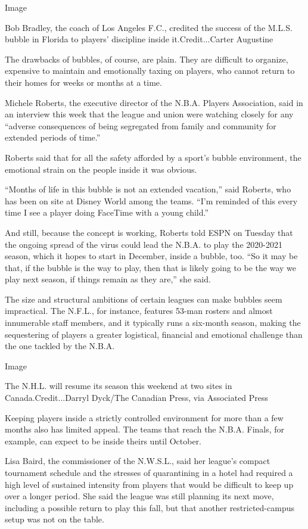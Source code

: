 Image

Bob Bradley, the coach of Los Angeles F.C., credited the success of the
M.L.S. bubble in Florida to players' discipline inside
it.Credit...Carter Augustine

The drawbacks of bubbles, of course, are plain. They are difficult to
organize, expensive to maintain and emotionally taxing on players, who
cannot return to their homes for weeks or months at a time.

Michele Roberts, the executive director of the N.B.A. Players
Association, said in an interview this week that the league and union
were watching closely for any ``adverse consequences of being segregated
from family and community for extended periods of time.''

Roberts said that for all the safety afforded by a sport's bubble
environment, the emotional strain on the people inside it was obvious.

``Months of life in this bubble is not an extended vacation,'' said
Roberts, who has been on site at Disney World among the teams. ``I'm
reminded of this every time I see a player doing FaceTime with a young
child.''

And still, because the concept is working, Roberts told ESPN on Tuesday
that the ongoing spread of the virus could lead the N.B.A. to play the
2020-2021 season, which it hopes to start in December, inside a bubble,
too. ``So it may be that, if the bubble is the way to play, then that is
likely going to be the way we play next season, if things remain as they
are,'' she said.

The size and structural ambitions of certain leagues can make bubbles
seem impractical. The N.F.L., for instance, features 53-man rosters and
almost innumerable staff members, and it typically runs a six-month
season, making the sequestering of players a greater logistical,
financial and emotional challenge than the one tackled by the N.B.A.

Image

The N.H.L. will resume its season this weekend at two sites in
Canada.Credit...Darryl Dyck/The Canadian Press, via Associated Press

Keeping players inside a strictly controlled environment for more than a
few months also has limited appeal. The teams that reach the N.B.A.
Finals, for example, can expect to be inside theirs until October.

Lisa Baird, the commissioner of the N.W.S.L., said her league's compact
tournament schedule and the stresses of quarantining in a hotel had
required a high level of sustained intensity from players that would be
difficult to keep up over a longer period. She said the league was still
planning its next move, including a possible return to play this fall,
but that another restricted-campus setup was not on the table.

